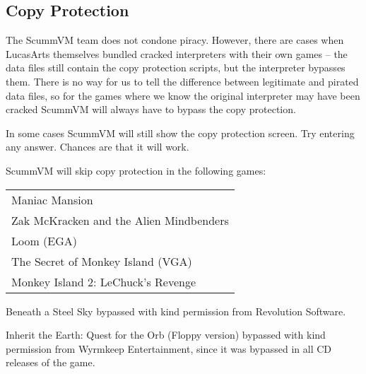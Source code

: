 \subsection{Copy Protection}

The ScummVM team does not condone piracy. However, there are cases when
LucasArts themselves bundled cracked interpreters with their own games --
the data files still contain the copy protection scripts, but the interpreter
bypasses them. There is no way for us to tell the difference between legitimate
and pirated data files, so for the games where we know the original interpreter
may have been cracked ScummVM will always have to bypass the copy protection.

In some cases ScummVM will still show the copy protection screen. Try entering
any answer. Chances are that it will work.

ScummVM will skip copy protection in the following games:

\begin{tabular}{l}
Maniac Mansion\\
Zak McKracken and the Alien Mindbenders\\
Loom (EGA)\\
The Secret of Monkey Island (VGA)\\
Monkey Island 2: LeChuck's Revenge\\
\end{tabular}

Beneath a Steel Sky bypassed with kind permission from Revolution Software.

Inherit the Earth: Quest for the Orb (Floppy version) bypassed with kind
permission from Wyrmkeep Entertainment, since it was bypassed in all CD
releases of the game.


